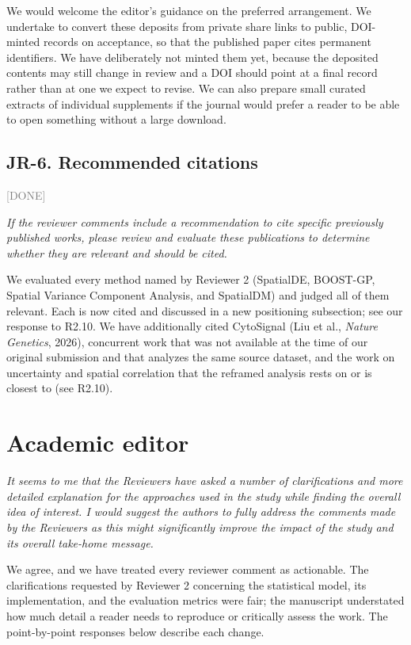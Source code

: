 \documentclass[11pt]{article}
\newcommand{\status}[1]{\textcolor{gray}{\small\textsf{[#1]}}}
\newenvironment{rev}{\begin{leftbar}\itshape\small}{\end{leftbar}}
\begin{document}
We would welcome the editor's guidance on the preferred arrangement. We undertake to convert
these deposits from private share links to public, DOI-minted records on acceptance, so that
the published paper cites permanent identifiers. We have deliberately not minted them yet,
because the deposited contents may still change in review and a DOI should point at a final
record rather than at one we expect to revise. We can also prepare small curated extracts of
individual supplements if the journal would prefer a reader to be able to open something
without a large download.

\subsection{JR-6. Recommended citations} \status{DONE}

\begin{rev}
If the reviewer comments include a recommendation to cite specific previously published
works, please review and evaluate these publications to determine whether they are
relevant and should be cited.
\end{rev}

\noindent We evaluated every method named by Reviewer 2 (SpatialDE, BOOST-GP, Spatial
Variance Component Analysis, and SpatialDM) and judged all of them relevant. Each is now
cited and discussed in a new positioning subsection; see our response to R2.10. We have
additionally cited CytoSignal (Liu et al., \emph{Nature Genetics}, 2026), concurrent work
that was not available at the time of our original submission and that analyzes the same
source dataset, and the work on uncertainty and spatial correlation that the reframed analysis
rests on or is closest to (see R2.10).

\section{Academic editor}

\begin{rev}
It seems to me that the Reviewers have asked a number of clarifications and more detailed
explanation for the approaches used in the study while finding the overall idea of
interest. I would suggest the authors to fully address the comments made by the Reviewers
as this might significantly improve the impact of the study and its overall take-home
message.
\end{rev}

\noindent We agree, and we have treated every reviewer comment as actionable. The
clarifications requested by Reviewer 2 concerning the statistical model, its
implementation, and the evaluation metrics were fair; the manuscript understated how much
detail a reader needs to reproduce or critically assess the work. The point-by-point
responses below describe each change.
\end{document}
